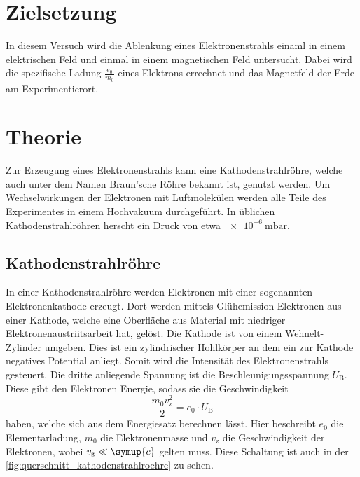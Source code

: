 \section{Zielsetzung}
\label{sec:Zielsetzung}

    In diesem Versuch wird die Ablenkung eines Elektronenstrahls einaml in einem elektrischen Feld und einmal in einem magnetischen Feld untersucht. Dabei wird 
    die spezifische Ladung $\frac{e_0}{m_0}$ eines Elektrons errechnet und das Magnetfeld der Erde am Experimentierort. 

\section{Theorie}
\label{sec:Theorie}

Zur Erzeugung eines Elektronenstrahls kann eine Kathodenstrahlröhre, welche auch unter dem Namen Braun'sche Röhre bekannt ist, genutzt werden. Um Wechselwirkungen 
der Elektronen mit Luftmolekülen werden alle Teile des Experimentes in einem Hochvakuum durchgeführt. In üblichen Kathodenstrahlröhren herscht ein Druck von 
etwa $\SI{e-6}{\milli\bar}$. 

\subsection{Kathodenstrahlröhre}

    In einer Kathodenstrahlröhre werden Elektronen mit einer sogenannten Elektronenkathode erzeugt. Dort werden mittels Glühemission Elektronen aus einer
    Kathode, welche eine Oberfläche aus Material mit niedriger Elektronenaustriitsarbeit hat, gelöst. Die Kathode ist von einem Wehnelt-Zylinder umgeben.
    Dies ist ein zylindrischer Hohlkörper an dem ein zur Kathode negatives Potential anliegt. Somit wird die Intensität des Elektronenstrahls gesteuert. 
    Die dritte anliegende Spannung ist die Beschleunigungsspannung $U_{\text{B}}$. Diese gibt den Elektronen Energie, sodass sie die Geschwindigkeit
    \begin{equation} \label{eqn:v_z}
        \frac{m_0 v_{\text{z}}^2}{2} = e_0 \cdot U_{\text{B}}
    \end{equation}
    haben, welche sich aus dem Energiesatz berechnen lässt. Hier beschreibt $e_0$ die Elementarladung, $m_0$ die Elektronenmasse und $v_{\text{z}}$ die 
    Geschwindigkeit der Elektronen, wobei $v_{\text{z}} \ll \symup{c} $ gelten muss. Diese Schaltung ist auch in der \autoref{fig:querschnitt_kathodenstrahlroehre}
    zu sehen.\\

